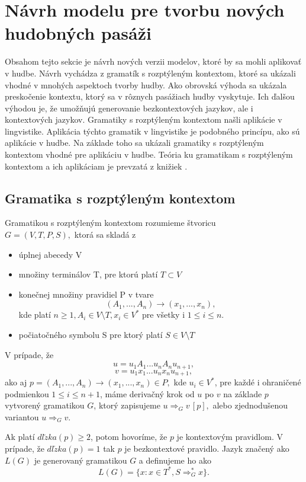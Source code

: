 \chapter{Návrh modelu pre tvorbu nových hudobných pasáži}
\label{chap:app}
Obsahom tejto sekcie je návrh nových verzii modelov, ktoré by sa mohli aplikovať v hudbe. Návrh vychádza z gramatík s rozptýleným kontextom, ktoré sa ukázali vhodné v mnohých aspektoch tvorby hudby. Ako obrovská výhoda sa ukázala preskočenie kontextu, ktorý sa v rôznych pasážiach hudby vyskytuje. Ich ďalšou výhodou je, že umožňujú generovanie bezkontextových jazykov, ale i kontextových jazykov. Gramatiky s rozptýleným kontextom našli aplikácie v lingvistike. Aplikácia týchto gramatik v lingvistike je podobného princípu, ako sú aplikácie v hudbe. Na základe toho sa ukázali gramatiky s rozptýleným kontextom vhodné pre aplikáciu v hudbe. Teória ku gramatikam s rozptýleným kontextom a ich aplikáciam je prevzatá z knižiek \cite{FITPUB8997, FITPUB10498}.

\section{Gramatika s rozptýleným kontextom}
\begin{definition}
Gramatikou s rozptýleným kontextom rozumieme štvoricu \\ $G = (V,T,P,S),$ ktorá sa skladá z
\begin{itemize}\itemsep0.05em
    \item úplnej abecedy V 
    \item množiny terminálov T, pre ktorú platí $T \subset V$
    \item konečnej množiny pravidiel P v tvare $$(A_1, ..., A_n) \rightarrow (x_1, ..., x_n),$$ kde platí $n \geq 1, A_i \in V \setminus T, x_i \in V^*$ pre všetky i $1 \leq i \leq n.$
    \item počiatočného symbolu S pre ktorý platí $S \in V \setminus T$
\end{itemize}
\end{definition}

V prípade, že $$u = u_1A_1...u_nA_nu_{n+1},$$$$v = u_1x_1...u_nx_nu_{n+1},$$ ako aj $p = (A_1, ..., A_n) \rightarrow (x_1, ..., x_n) \in P,$ kde $u_i \in V^*$, pre každé i ohraničené podmienkou $1 \leq i \leq n + 1$, máme derivačný krok od $u$ po $v$ na základe $p$ vytvorený gramatikou $G$, ktorý zapisujeme $u \Rightarrow_G v \, [p],$ alebo zjednodušenou variantou $u \Rightarrow_G v$.

Ak platí $dl\check{z}ka(p) \geq 2$, potom hovoríme, že $p$ je kontextovým pravidlom. V prípade, že $dl\check{z}ka(p) = 1$ tak $p$ je bezkontextové pravidlo. Jazyk značený ako $L(G)$ je generovaný gramatikou $G$ a definujeme ho ako $$L(G) = \{x: x \in T^*, S \Rightarrow^*_G x\}.$$

